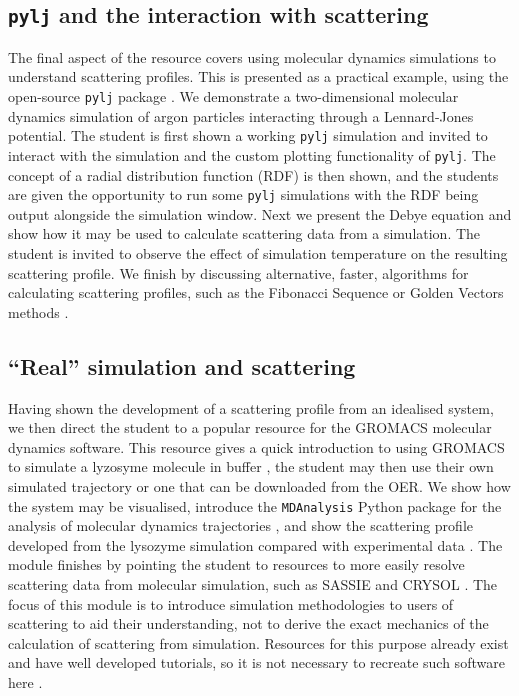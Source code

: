 \documentclass[amsmath,amssymb,twocolumn,superscriptaddress]{revtex4-1}
\begin{document}
\subsection{\texttt{pylj} and the interaction with scattering}

The final aspect of the resource covers using molecular dynamics simulations to understand scattering profiles.
This is presented as a practical example, using the open-source \texttt{pylj} package \cite{mccluskey_pylj_2018,mccluskey_arm61/pylj_2019-2}.
We demonstrate a two-dimensional molecular dynamics simulation of argon particles interacting through a Lennard-Jones potential.
The student is first shown a working \texttt{pylj} simulation and invited to interact with the simulation and the custom plotting functionality of \texttt{pylj}.
The concept of a radial distribution function (RDF) is then shown, and the students are given the opportunity to run some \texttt{pylj} simulations with the RDF being output alongside the simulation window.
Next we present the Debye equation \cite{debye_zerstreuung_1915} and show how it may be used to calculate scattering data from a simulation.
The student is invited to observe the effect of simulation temperature on the resulting scattering profile.
We finish by discussing alternative, faster, algorithms for calculating scattering profiles, such as the Fibonacci Sequence or Golden Vectors methods \cite{svergun_solution_1994,watson_rapid_2013}.

\subsection{``Real'' simulation and scattering}

Having shown the development of a scattering profile from an idealised system, we then direct the student to a popular resource for the GROMACS \cite{berendsen_gromacs_1995} molecular dynamics software.
This resource gives a quick introduction to using GROMACS to simulate a lyzosyme molecule in buffer \cite{lemkul_gromacs_2019}, the student may then use their own simulated trajectory or one that can be downloaded from the OER.
We show how the system may be visualised, introduce the \texttt{MDAnalysis} Python package for the analysis of molecular dynamics trajectories \cite{michaud-agrawal_mdanalysis_2011,gowers_mdanalysis_2016}, and show the scattering profile developed from the lysozyme simulation compared with experimental data \cite{franke_correlation_2015}.
The module finishes by pointing the student to resources to more easily resolve scattering data from molecular simulation, such as SASSIE and CRYSOL \cite{perkins_atomistic_2016,svergun_crysol_1995}.
The focus of this module is to introduce simulation methodologies to users of scattering to aid their understanding, not to derive the exact mechanics of the calculation of scattering from simulation.
Resources for this purpose already exist and have well developed tutorials, so it is not necessary to recreate such software here \cite{perkins_atomistic_2016,svergun_crysol_1995}.
\end{document}
